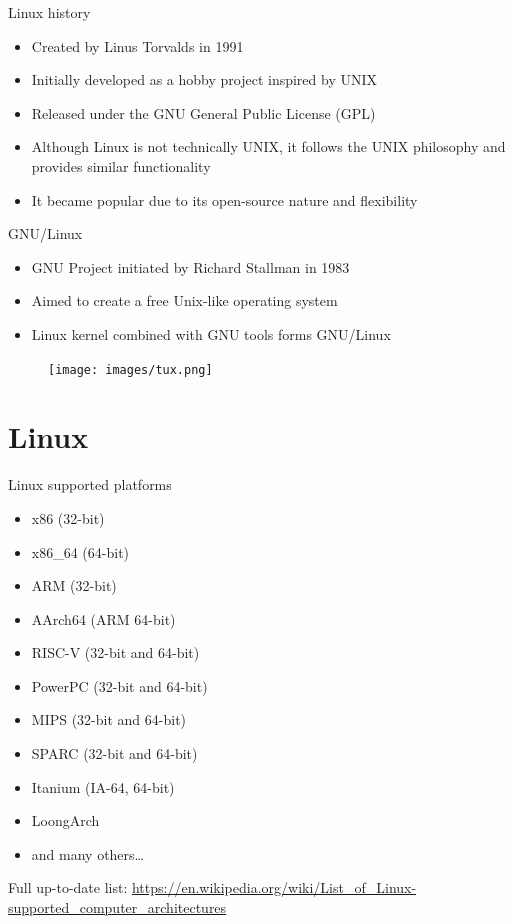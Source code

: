 \documentclass{beamer}
\begin{document}
\begin{frame}{Linux history}
  \begin{itemize}
    \item Created by Linus Torvalds in 1991
    \item Initially developed as a hobby project inspired by UNIX
    \item Released under the GNU General Public License (GPL)
    \item Although Linux is not technically UNIX, it follows the UNIX philosophy and provides similar functionality
    \item It became popular due to its open-source nature and flexibility
  \end{itemize}
\end{frame}

\begin{frame}{GNU/Linux}
  \begin{minipage}[t]{0.6\textwidth}
    \begin{itemize}
      \item GNU Project initiated by Richard Stallman in 1983
      \item Aimed to create a free Unix-like operating system
      \item Linux kernel combined with GNU tools forms GNU/Linux
    \end{itemize}
  \end{minipage}
  \hfill
  \begin{minipage}[t]{0.35\textwidth}
    \begin{figure}[h]
      \texttt{[image: images/tux.png]}
    \end{figure}
  \end{minipage}
\end{frame}

\section{Linux}

\begin{frame}{Linux supported platforms}
  \begin{itemize}
    \item x86 (32-bit)
    \item x86\_64 (64-bit)
    \item ARM (32-bit)
    \item AArch64 (ARM 64-bit)
    \item RISC-V (32-bit and 64-bit)
    \item PowerPC (32-bit and 64-bit)
    \item MIPS (32-bit and 64-bit)
    \item SPARC (32-bit and 64-bit)
    \item Itanium (IA-64, 64-bit)
    \item LoongArch
    \item and many others\ldots
  \end{itemize}

  \footnotesize Full up-to-date list: \href{https://en.wikipedia.org/wiki/List_of_Linux-supported_computer_architectures}{https://en.wikipedia.org/wiki/List\_of\_Linux-supported\_computer\_architectures}
\end{frame}
\end{document}
